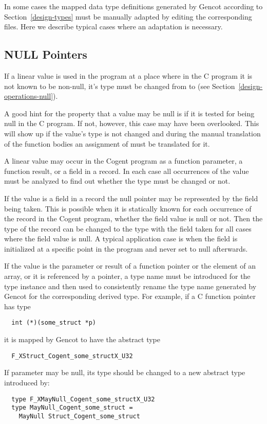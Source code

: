 In some cases the mapped data type definitions generated by Gencot according to Section~\ref{design-types} must be manually
adapted by editing the corresponding  files. Here we describe typical cases where an adaptation is
necessary.

\subsection{NULL Pointers}
\label{app-transtype-null}

If a linear value is used in the program at a place where in the C program it is not known to be non-null, it's type
must be changed from  to  (see Section~\ref{design-operations-null}).

A good hint for the property that a value may be null is if it is tested for being null in the C program. If not, however,
this case may have been overlooked. This will show up if the value's type is not changed and during the manual translation
of the function bodies an assignment of  must be translated for it.

A linear value may occur in the Cogent program as a function parameter, a function result, or a field in a record. In each case
all occurrences of the value must be analyzed to find out whether the type must be changed or not.

If the value is a field in a record the null pointer may be represented by the field being taken. This is possible when 
it is statically known for each occurrence of the record in the Cogent program, whether the field value is null or not. 
Then the type of the record can be changed to the type with the field taken for all cases where the field value is null.
A typical application case is when the field is initialized at a specific point in the program and never set to null
afterwards.

If the value is the parameter or result of a function pointer or the element of an array, or it is referenced by a pointer,
a type name must be introduced 
for the  type instance and then used to consistently rename the type name generated by Gencot for the 
corresponding derived type. For example, if a C function pointer has type
\begin{verbatim}
  int (*)(some_struct *p)
\end{verbatim}
it is mapped by Gencot to have the abstract type
\begin{verbatim}
  F_XStruct_Cogent_some_structX_U32
\end{verbatim}
If parameter  may be null, its type should be changed to a new abstract type introduced by:
\begin{verbatim}
  type F_XMayNull_Cogent_some_structX_U32
  type MayNull_Cogent_some_struct = 
    MayNull Struct_Cogent_some_struct
\end{verbatim}

